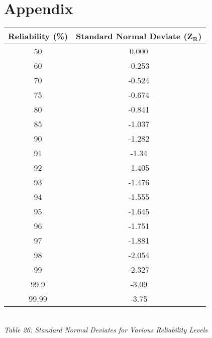 \documentclass{article}
\begin{document}
\section{Appendix}
\begin{center}
    \begin{tabular}{|c|c|}
        \hline
        \textbf{Reliability (\%)} & \textbf{Standard Normal Deviate ($\bm{Z_R}$)} \\\hline
        50 & 0.000 \\\hline
        60 & -0.253 \\\hline
        70 & -0.524 \\ \hline
        75 & -0.674 \\\hline
        80 & -0.841 \\ \hline
        85 & -1.037 \\\hline
        90 & -1.282 \\\hline
        91 & -1.34 \\ \hline
        92 & -1.405 \\\hline
        93 & -1.476 \\\hline
        94 & -1.555 \\\hline
        95 & -1.645 \\ \hline
        96 & -1.751 \\ \hline
        97 & -1.881 \\ \hline
        98 & -2.054 \\ \hline
        99 & -2.327 \\ \hline
        99.9 & -3.09 \\\hline
        99.99 & -3.75\\\hline
    \end{tabular}
    \vspace{3mm}
    \emph{\\Table 26: Standard Normal Deviates for Various Reliability Levels\\}



\end{center}
\end{document}
